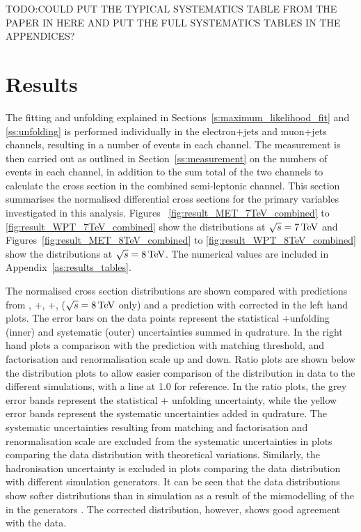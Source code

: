 TODO:COULD PUT THE TYPICAL SYSTEMATICS TABLE FROM THE PAPER IN HERE AND PUT THE FULL SYSTEMATICS TABLES IN THE
APPENDICES?

\section{Results}
\label{s:results}

The fitting and unfolding explained in Sections~\ref{s:maximum_likelihood_fit} and \ref{ss:unfolding} is
performed individually in the electron+jets and muon+jets channels, resulting in a number of \ttbar events in
each channel. The measurement is then carried out as outlined in Section~\ref{ss:measurement} on the numbers
of events in each channel, in addition to the sum total of the two channels to calculate the cross section in
the combined semi-leptonic channel. This section summarises the normalised differential cross sections for the
primary variables investigated in this analysis. Figures ~\ref{fig:result_MET_7TeV_combined} to
\ref{fig:result_WPT_7TeV_combined} show the distributions at $\sqrt{s}=7\,\text{Te\hspace{-.08em}V}$ and
Figures~\ref{fig:result_MET_8TeV_combined} to \ref{fig:result_WPT_8TeV_combined} show the distributions at
$\sqrt{s}=8\,\text{Te\hspace{-.08em}V}$. The numerical values are included in Appendix~\ref{as:results_tables}.

The normalised cross section distributions are shown compared with predictions from \MADGRAPH,
\POWHEG+\PYTHIA, \POWHEG+\HERWIG, \MCATNLO ($\sqrt{s}=8\,\text{Te\hspace{-.08em}V}$ only) and a \MADGRAPH prediction with corrected
\tquark \pt in the left hand plots. The error bars on the data points represent the statistical +unfolding
(inner) and systematic (outer) uncertainties summed in qudrature. In the right hand plots a comparison with
the \MADGRAPH prediction with matching threshold, and factorisation and renormalisation scale up and down.
Ratio plots are shown below the distribution plots to allow easier comparison of the distribution in data to
the different simulations, with a line at 1.0 for reference. In the ratio plots, the grey error bands
represent the statistical + unfolding uncertainty, while the yellow error bands represent the systematic
uncertainties added in qudrature. The systematic uncertainties resulting from matching and factorisation and
renormalisation scale are excluded from the systematic uncertainties in plots comparing the data distribution
with theoretical variations. Similarly, the hadronisation uncertainty is excluded in plots comparing the data
distribution with different simulation generators. It can be seen that the data distributions show softer
distributions than in simulation as a result of the mismodelling of the \tquark \pt in the generators
\cite{Chatrchyan:2012saa}. The corrected \MADGRAPH distribution, however, shows good agreement with the data.

